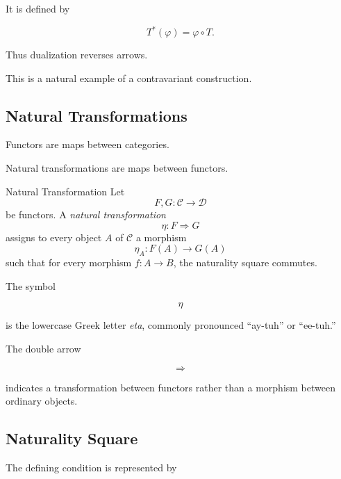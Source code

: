 It is defined by

\[ T^*(\varphi)=\varphi\circ T. \]

Thus dualization reverses arrows.

This is a natural example of a contravariant construction.

\subsection{Natural Transformations}
\label{subsec:natural-transformations}

Functors are maps between categories.

Natural transformations are maps between functors.

\begin{definitionbox}{Natural Transformation}
Let
\[ F,G:\mathcal C\to\mathcal D \]
be functors. A \emph{natural transformation}
\[ \eta:F\Rightarrow G \]
assigns to every object \(A\) of \(\mathcal C\) a morphism
\[ \eta_A:F(A)\to G(A) \]
such that for every morphism \(f:A\to B\), the naturality square commutes.
\end{definitionbox}

The symbol

\[ \eta \]

is the lowercase Greek letter \emph{eta}, commonly pronounced
``ay-tuh'' or ``ee-tuh.''

The double arrow

\[ \Rightarrow \]

indicates a transformation between functors rather than a morphism between
ordinary objects.

\subsection{Naturality Square}
\label{subsec:naturality-square}

The defining condition is represented by

\begin{center}
\end{center}

